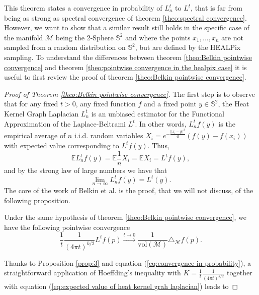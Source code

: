 This theorem states a convergence in probability of $L_n^t$ to $L^t$, that is far from being as strong as spectral convergence of theorem \ref{theo:spectral convergence}. However, we want to show that a similar result still holds in the specific case of the manifold $\mathcal M$ being the 2-Sphere $\mathbb S^2$ and where the points $x_1, ..., x_n$ are not sampled from a random distribution on $\mathbb S^2$, but are defined by the HEALPix sampling. To understand the differences between theorem \ref{theo:Belkin pointwise convergence} and theorem \ref{theo:pointwise convergence in the healpix case} it is useful to first review the proof of theorem \ref{theo:Belkin pointwise convergence}.
\begin{proof}[Proof of Theorem \ref{theo:Belkin pointwise convergence}]
The first step is to observe that for any fixed $t>0$, any fixed function $f$ and a fixed point $y\in\mathbb S^2$,  the Heat Kernel Graph Laplacian $L_n^t$ is an unbiased estimator for the Functional Approximation of the Laplace-Beltrami $L^t$. In other words, $L_n^tf(y)$ is the empirical average of $n$ i.i.d. random variables $X_i= e^{-\frac{||x_i-y||^2}{4t}}\left(f(y)-f(x_i)\right)$ with expected value corresponding to $L^tf(y)$. Thus,
\begin{equation}
\label{eq:expected value of heat kernel grah laplacian}
	\mathbb E L_n^tf(y) = 	\mathbb E \frac{1}{n}X_i = \mathbb E X_i = L^tf(y),
\end{equation}
and by the strong law of large numbers we have that
\begin{equation}
\label{eq:convergence in probability}
\lim_{n\to\infty}L_n^tf(y) = L^t(y).
\end{equation}
The core of the work of Belkin et al. is the proof, that we will not discuss, of the following proposition.

\begin{prop} Under the same hypothesis of theorem \ref{theo:Belkin pointwise convergence}, we have the following pointwise convergence
	$$\frac{1}{t}\frac{1}{(4\pi t)^{k/2}} L^tf(p) \xrightarrow{t\to 0 } \frac{1}{\text{vol}(\mathcal M)}\triangle_{\mathcal M}f(p).$$
	\label{prop:3}
\end{prop}

Thanks to Proposition \ref{prop:3} and equation (\ref{eq:convergence in probability}), a straightforward application of Hoeffding's inequality with $K=\frac{1}{t}\frac{1}{(4\pi t)^{k/2}}$ together with equation  (\ref{eq:expected value of heat kernel grah laplacian}) leads to


\end{proof}
